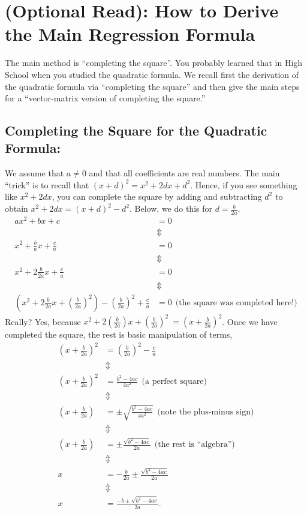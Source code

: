 \section{(Optional Read): How to Derive the Main Regression Formula}

The main method is ``completing the square''. You probably learned that in High School when you studied the quadratic formula. We recall first the derivation of the quadratic formula via ``completing the square'' and then give the main steps for a ``vector-matrix version of completing the square.''

\subsection{Completing the Square for the Quadratic Formula:}
We assume that $a\ne 0$ and that all coefficients are real numbers. The main ``trick'' is to recall that $(x+d)^2 = x^2 + 2 dx + d^2$. Hence, if you see something like $x^2 +2 dx$, you can complete the square by adding and subtracting $ d^2$ to obtain $x^2 + 2dx = (x+d)^2 -d^2 $. Below, we do this for $d=\frac{b}{2a}.$
\begin{align*}
    ax^2 + bx + c&=0 \\
    & \Updownarrow  \\
    x^2 + \frac{b}{a}x + \frac{c}{a} & = 0 \\
        & \Updownarrow  \\
    x^2 + 2\frac{b}{2 a}x + \frac{c}{a} & = 0 \\
    & \Updownarrow   \\
       \left( x^2 + 2\frac{b}{2 a}x + \left( \frac{b}{2a}\right)^2\right) - \left( \frac{b}{2a}\right)^2 + \frac{c}{a} & = 0   ~~\text{(the square was completed here!)}
    \end{align*} 
 Really? Yes, because $x^2 + 2\left(\frac{b}{2 a} \right)x + \left( \frac{b}{2a}\right)^2\ = \left(x +   \frac{b}{2a} \right)^2$. Once we have completed the square, the rest is basic manipulation of terms, 
    \begin{align*}
    \left(x +   \frac{b}{2a} \right)^2 & = \left( \frac{b}{2a}\right)^2 - \frac{c}{a} \\
      & \Updownarrow   \\
    \left(x +   \frac{b}{2a} \right)^2 & = \frac{b^2-4ac}{4a^2} ~~\text{(a perfect square)}\\
          & \Updownarrow   \\
    \left(x +   \frac{b}{2a} \right) & = \pm \sqrt{\frac{b^2-4ac}{4a^2}} ~~\text{(note the plus-minus sign)}\\
              & \Updownarrow   \\
    \left(x +   \frac{b}{2a} \right) & = \pm \frac{\sqrt{b^2-4ac}}{2a} ~~\text{(the rest is ``algebra'')}\\
                  & \Updownarrow   \\
x & = -\frac{b}{2a} \pm \frac{\sqrt{b^2-4ac}}{2a} \\
                  & \Updownarrow   \\
x & =  \frac{-b \pm \sqrt{b^2-4ac}}{2a}. 
\end{align*} 
